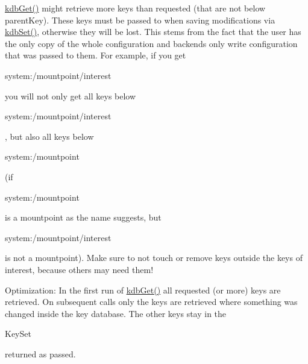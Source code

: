 \hyperlink{interfaceorg_1_1libelektra_1_1Elektra_a09ad2a446a215b6cce4cfb31d9871ac2}{kdb\+Get()} might retrieve more keys than requested (that are not below parent\+Key). These keys must be passed to when saving modifications via \hyperlink{interfaceorg_1_1libelektra_1_1Elektra_a7b69b22fd8b712891d188215707e0540}{kdb\+Set()}, otherwise they will be lost. This stems from the fact that the user has the only copy of the whole configuration and backends only write configuration that was passed to them. For example, if you get
\begin{DoxyCode}
system:/mountpoint/interest 
\end{DoxyCode}
 you will not only get all keys below
\begin{DoxyCode}
system:/mountpoint/interest 
\end{DoxyCode}
 , but also all keys below 
\begin{DoxyCode}
system:/mountpoint 
\end{DoxyCode}
 (if
\begin{DoxyCode}
system:/mountpoint 
\end{DoxyCode}
 is a mountpoint as the name suggests, but 
\begin{DoxyCode}
system:/mountpoint/interest 
\end{DoxyCode}
 is not a mountpoint). Make sure to not touch or remove keys outside the keys of interest, because others may need them!

Optimization\+: In the first run of \hyperlink{interfaceorg_1_1libelektra_1_1Elektra_a09ad2a446a215b6cce4cfb31d9871ac2}{kdb\+Get()} all requested (or more) keys are retrieved. On subsequent calls only the keys are retrieved where something was changed inside the key database. The other keys stay in the
\begin{DoxyCode}
KeySet 
\end{DoxyCode}
 returned as passed.

